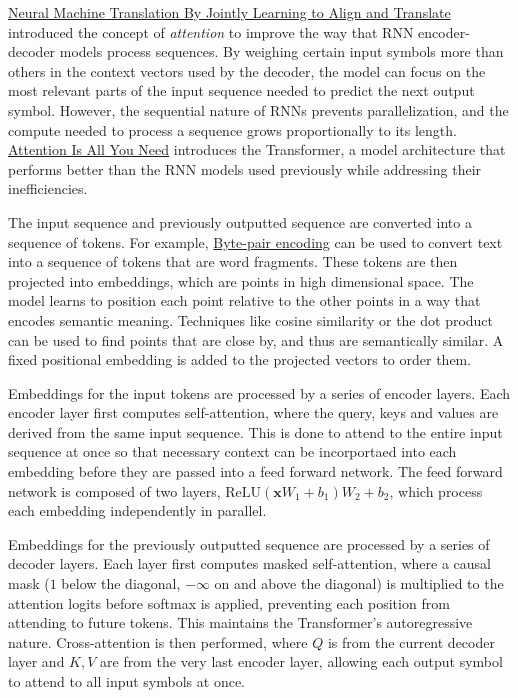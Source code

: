 \documentclass{article}
\begin{document}
\href{https://arxiv.org/abs/1409.0473}{Neural Machine Translation By Jointly Learning to Align and Translate} introduced the concept of \textit{attention} to improve the way that RNN encoder-decoder models process sequences. By weighing certain input symbols more than others in the context vectors used by the decoder, the model can focus on the most relevant parts of the input sequence needed to predict the next output symbol. However, the sequential nature of RNNs prevents parallelization, and the compute needed to process a sequence grows proportionally to its length. \href{https://arxiv.org/abs/1706.03762}{Attention Is All You Need} introduces the Transformer, a model architecture that performs better than the RNN models used previously while addressing their inefficiencies.

The input sequence and previously outputted sequence are converted into a sequence of tokens. For example, \href{https://en.wikipedia.org/wiki/Byte-pair_encoding}{Byte-pair encoding} can be used to convert text into a sequence of tokens that are word fragments. These tokens are then projected into embeddings, which are points in high dimensional space. The model learns to position each point relative to the other points in a way that encodes semantic meaning. Techniques like cosine similarity or the dot product can be used to find points that are close by, and thus are semantically similar. A fixed positional embedding is added to the projected vectors to order them.

Embeddings for the input tokens are processed by a series of encoder layers. Each encoder layer first computes self-attention, where the query, keys and values are derived from the same input sequence. This is done to attend to the entire input sequence at once so that necessary context can be incorportaed into each embedding before they are passed into a feed forward network. The feed forward network is composed of two layers, $\text{ReLU}(\mathbf{x} W_1 + b_1) W_2 + b_2$, which process each embedding independently in parallel.

Embeddings for the previously outputted sequence are processed by a series of decoder layers. Each layer first computes masked self-attention, where a causal mask ($1$ below the diagonal, $-\infty$ on and above the diagonal) is multiplied to the attention logits before softmax is applied, preventing each position from attending to future tokens. This maintains the Transformer's autoregressive nature. Cross-attention is then performed, where $Q$ is from the current decoder layer and $K, V$ are from the very last encoder layer, allowing each output symbol to attend to all input symbols at once.
\end{document}
